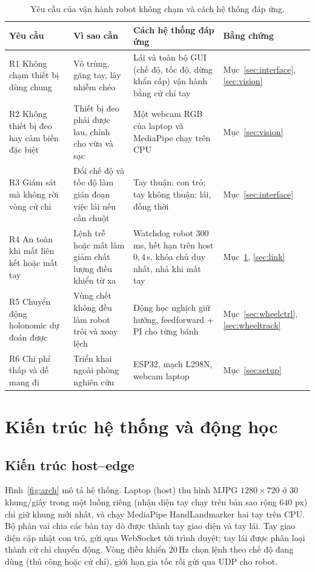 \documentclass[5p,twocolumn]{elsarticle}
\begin{document}
\begin{table}[!t]
\caption{Yêu cầu của vận hành robot không chạm và cách hệ thống đáp ứng.}
\label{tab:req}
\centering
\footnotesize
\setlength{\tabcolsep}{4pt}
\begin{tabular}{>{\raggedright\arraybackslash}p{}>{\raggedright\arraybackslash}p{}>{\raggedright\arraybackslash}p{}>{\raggedright\arraybackslash}p{}}
\toprule
Yêu cầu & Vì sao cần & Cách hệ thống đáp ứng & Bằng chứng \\
\midrule
R1 Không chạm thiết bị dùng chung & Vô trùng, găng tay, lây nhiễm chéo \cite{wachs2008,ohara2014,mewes2017} & Lái và toàn bộ GUI (chế độ, tốc độ, dừng khẩn cấp) vận hành bằng cử chỉ tay & Mục~\ref{sec:interface}, \ref{sec:vision} \\
R2 Không thiết bị đeo hay cảm biến đặc biệt & Thiết bị đeo phải được lau, chỉnh cho vừa và sạc \cite{bisi2018} & Một webcam RGB của laptop và MediaPipe chạy trên CPU & Mục~\ref{sec:vision} \\
R3 Giám sát mà không rời vòng cử chỉ & Đổi chế độ và tốc độ làm gián đoạn việc lái nếu cần chuột & Tay thuận: con trỏ; tay không thuận: lái, đồng thời \cite{guiard1987} & Mục~\ref{sec:interface} \\
R4 An toàn khi mất liên kết hoặc mất tay & Lệnh trễ hoặc mất làm giảm chất lượng điều khiển từ xa \cite{ferrell1965,lane2002} & Watchdog robot $300$\,ms, hết hạn trên host $0{,}4$\,s, khóa chủ duy nhất, nhả khi mất tay & Mục~\ref{sec:arch}, \ref{sec:link} \\
R5 Chuyển động holonomic dự đoán được & Vùng chết không đều làm robot trôi và xoay lệch & Động học nghịch giữ hướng, feedforward + PI cho từng bánh & Mục~\ref{sec:wheelctrl}, \ref{sec:wheeltrack} \\
R6 Chi phí thấp và dễ mang đi & Triển khai ngoài phòng nghiên cứu & ESP32, mạch L298N, webcam laptop & Mục~\ref{sec:setup} \\
\bottomrule
\end{tabular}
\end{table}

\section{Kiến trúc hệ thống và động học}\label{sec:arch}
\subsection{Kiến trúc host--edge}
Hình~\ref{fig:arch} mô tả hệ thống. Laptop (host) thu hình MJPG $1280\times720$ ở 30 khung/giây trong một luồng riêng (nhận diện tay chạy trên bản sao rộng $640$ px) chỉ giữ khung mới nhất, và chạy MediaPipe HandLandmarker hai tay \cite{zhang2020,lugaresi2019} trên CPU. Bộ phân vai chia các bàn tay dò được thành tay giao diện và tay lái. Tay giao diện cập nhật con trỏ, gửi qua WebSocket tới trình duyệt; tay lái được phân loại thành cử chỉ chuyển động. Vòng điều khiển 20\,Hz chọn lệnh theo chế độ đang dùng (thủ công hoặc cử chỉ), giới hạn gia tốc rồi gửi qua UDP cho robot.
\end{document}
